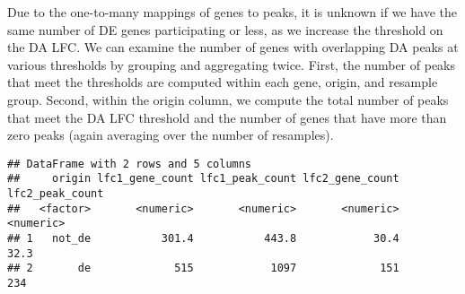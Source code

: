 \documentclass[
]{article}
\newenvironment{Shaded}{}{}
\newcommand{\DataTypeTok}[1]{\textcolor[rgb]{0.56,0.13,0.00}{#1}}
\newcommand{\DecValTok}[1]{\textcolor[rgb]{0.25,0.63,0.44}{#1}}
\newcommand{\KeywordTok}[1]{\textcolor[rgb]{0.00,0.44,0.13}{\textbf{#1}}}
\newcommand{\NormalTok}[1]{#1}
\newcommand{\OperatorTok}[1]{\textcolor[rgb]{0.40,0.40,0.40}{#1}}
\newcommand{\OtherTok}[1]{\textcolor[rgb]{0.00,0.44,0.13}{#1}}
\newcommand{\StringTok}[1]{\textcolor[rgb]{0.25,0.44,0.63}{#1}}
\begin{document}
Due to the one-to-many mappings of genes to peaks, it is unknown if we have the
same number of DE genes participating or less, as we increase the threshold on
the DA LFC. We can examine the number of genes with overlapping DA peaks at
various thresholds by grouping and aggregating twice. First, the number of
peaks that meet the thresholds are computed within each gene, origin, and
resample group. Second, within the origin column, we compute the total number
of peaks that meet the DA LFC threshold and the number of genes that have more
than zero peaks (again averaging over the number of resamples).

\begin{Shaded}
\end{Shaded}

\begin{verbatim}
## DataFrame with 2 rows and 5 columns
##     origin lfc1_gene_count lfc1_peak_count lfc2_gene_count lfc2_peak_count
##   <factor>       <numeric>       <numeric>       <numeric>       <numeric>
## 1   not_de           301.4           443.8            30.4            32.3
## 2       de             515            1097             151             234
\end{verbatim}
\end{document}

